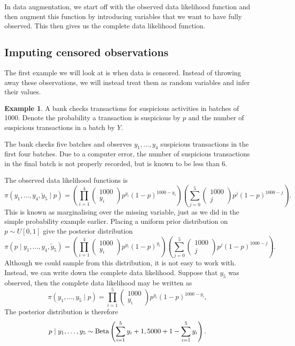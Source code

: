 \documentclass[
]{book}
\theoremstyle{definition}
\theoremstyle{definition}
\newtheorem{example}{Example}[chapter]
\theoremstyle{definition}
\theoremstyle{definition}
\theoremstyle{remark}
\begin{document}
In data augmentation, we start off with the observed data likelihood function and then augment this function by introducing variables that we want to have fully observed. This then gives us the complete data likelihood function.

\subsection{Imputing censored observations}\label{imputing-censored-observations}

The first example we will look at is when data is censored. Instead of throwing away these observations, we will instead treat them as random variables and infer their values.

\begin{example}
A bank checks transactions for suspicious activities in batches of 1000. Denote the probability a transaction is suspicious by \(p\) and the number of suspicious transactions in a batch by \(Y\).

The bank checks five batches and observes \(y_1, \ldots, y_4\) suspicious transactions in the first four batches. Due to a computer error, the number of suspicious transactions in the final batch is not properly recorded, but is known to be less than 6.

The observed data likelihood functions is
\[
\pi(y_1, \ldots, y_4, \tilde{y}_5 \mid p) = \left(\prod_{i=1}^4\begin{pmatrix} 1000 \\ y_i \end{pmatrix} p^{y_i}(1-p)^{1000 - y_i} \right)\left(\sum_{j=0}^5\begin{pmatrix} 1000 \\ j \end{pmatrix} p^{j}(1-p)^{1000 - j}\right).
\]
This is known as marginalising over the missing variable, just as we did in the simple probability example earlier. Placing a uniform prior distribution on \(p \sim U[0, 1]\) give the posterior distribution
\[
\pi(p \mid y_1, \ldots, y_4, \tilde{y}_5)= \left(\prod_{i=1}^4\begin{pmatrix} 1000 \\ y_i \end{pmatrix} p^{y_i}(1-p)^{y_i} \right)\left(\sum_{j=0}^5\begin{pmatrix} 1000 \\ j \end{pmatrix} p^{j}(1-p)^{1000 - j}\right).
\]
Although we could sample from this distribution, it is not easy to work with. Instead, we can write down the complete data likelihood. Suppose that \(y_5\) was observed, then the complete data likelihood may be written as
\[
\pi(y_1, \ldots, y_5 \mid p)  = \prod_{i=1}^5\begin{pmatrix} 1000 \\ y_i \end{pmatrix} p^{y_i}(1-p)^{1000 - y_i},
\]
The posterior distribution is therefore
\[
p \mid y_1, \ldots, y_5 \sim \hbox{Beta}\left(\sum_{i=1}^5 y_i + 1, 5000 + 1 - \sum_{i=1}^5 y_i\right).
\]


\end{example}
\end{document}
